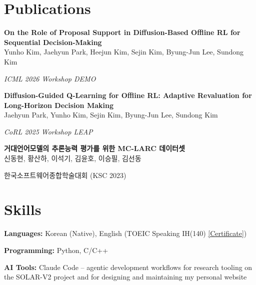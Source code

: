 \documentclass[10.5pt,a4paper]{article}
\newcommand{\pub}[4]{%
  \textbf{#1}\\
  #2\\
  {\raggedright\textit{\textcolor{textgray}{#3}}#4\par}\vspace{0.6em}
}
\newcommand{\pubkr}[4]{%
  {\cjkfont\bfseries #1}\\
  {\cjkfont #2}\\
  {\raggedright{\cjkfont\textcolor{textgray}{#3}}#4\par}\vspace{0.6em}
}
\begin{document}
\section{Publications}

\pub{On the Role of Proposal Support in Diffusion-Based Offline RL for Sequential Decision-Making}
{Yunho Kim, Jaehyun Park, Heejun Kim, Sejin Kim, Byung-Jun Lee, Sundong Kim}
{ICML 2026 Workshop DEMO}{}

\pub{Diffusion-Guided Q-Learning for Offline RL: Adaptive Revaluation for Long-Horizon Decision Making}
{Jaehyun Park, Yunho Kim, Sejin Kim, Byung-Jun Lee, Sundong Kim}
{CoRL 2025 Workshop LEAP}{}

\pubkr{거대언어모델의 추론능력 평가를 위한 MC-LARC 데이터셋}
{신동현, 황산하, 이석기, 김윤호, 이승필, 김선동}
{한국소프트웨어종합학술대회 (KSC 2023)}{\,\textbar\; 2023}

\section{Skills}

\textbf{Languages:} Korean (Native), English (TOEIC Speaking IH(140) \href{https://qazyunho.github.io/website/certificates/TOEIC_Speaking_Score.pdf}{[Certificate]})\par\vspace{0.4em}
\textbf{Programming:} Python, C/C++\par\vspace{0.4em}
\textbf{AI Tools:} Claude Code -- agentic development workflows for research tooling on the SOLAR-V2 project and for designing and maintaining my personal website
\end{document}
